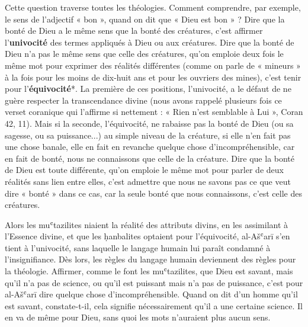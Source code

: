 Cette question traverse toutes les théologies. Comment comprendre, par
exemple, le sens de l'adjectif « bon », quand on dit que « Dieu est bon
» ? Dire que la bonté de Dieu a le même sens que la bonté des créatures,
c'est affirmer l'\textbf{univocité} des termes appliqués à Dieu ou aux
créatures. Dire que la bonté de Dieu n'a pas le même sens que celle des
créatures, qu'on emploie deux fois le même mot pour exprimer des
réalités différentes (comme on parle de
« mineurs » à la fois pour les moins de dix-huit ans et pour les
ouvriers des mines), c'est tenir pour l'\textbf{équivocité}*. La
première de ces positions, l'univocité, a le défaut de ne guère
respecter la transcendance divine (nous avons rappelé plusieurs fois ce
verset coranique qui l'affirme si nettement : « Rien n'est semblable à
Lui », Coran 42, 11). Mais si la seconde, l'équivocité, ne rabaisse pas
la bonté de Dieu (ou sa sagesse, ou sa puissance...) au simple niveau de
la créature, si elle n'en fait pas une chose banale, elle en fait en
revanche quelque chose d'incompréhensible, car en fait de bonté, nous ne
connaissons que celle de la créature. Dire que la bonté de Dieu est
toute différente, qu'on emploie le même mot pour parler de deux réalités
sans lien entre elles, c'est admettre que nous ne savons pas ce que veut
dire « bonté » dans ce cas, car la seule bonté que nous connaissons,
c'est celle des créatures.

Alors les muʿtazilites niaient la réalité des attributs divins, en les
assimilant à l'Essence divine, et que les ḥanbalites optaient pour
l'équivocité, al-Ašʿarī s'en tient à l'univocité, sans laquelle le
langage humain lui paraît condamné à l'insignifiance. Dès lors, les
règles du langage humain deviennent des règles pour la théologie.
Affirmer, comme le font les muʿtazilites, que Dieu est savant, mais
qu'il n'a pas de science, ou qu'il est puissant mais n'a pas de
puissance, c'est pour al-Ašʿarī dire quelque chose d'incompréhensible.
Quand on dit
d'un homme qu'il est savant, constate-t-il, cela signifie nécessairement
qu'il a une certaine science. Il en va de même pour Dieu, sans quoi les
mots n'auraient plus aucun sens.

